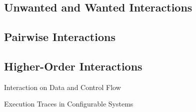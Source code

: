 \subsection{Unwanted and Wanted Interactions} %

\subsection{Pairwise Interactions}
\subsection{Higher-Order Interactions}

\begin{frame}{Interaction on Data and Control Flow \mytitlesource{\essentialconfigurationcomplexity}}
	\centering
\end{frame}
\begin{frame}{Execution Traces in Configurable Systems \mytitlesource{\essentialconfigurationcomplexity}}
\end{frame}



